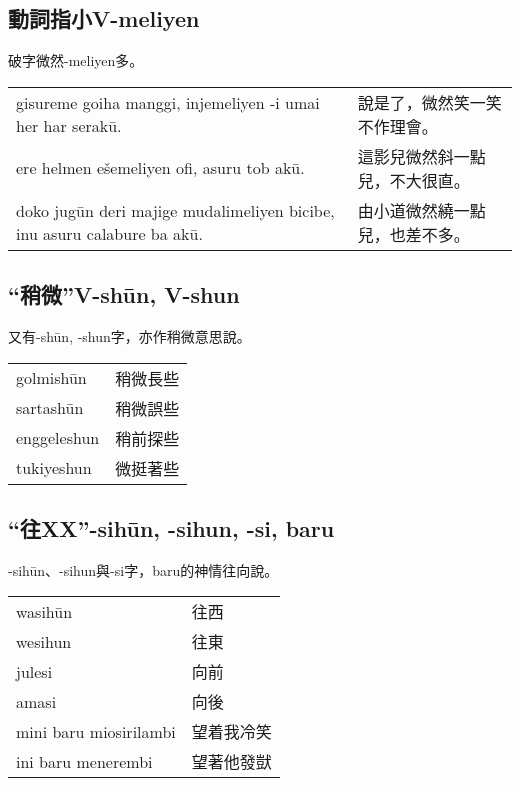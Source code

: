 \documentclass{article}
\begin{document}
\subsection{動詞指小V-meliyen}
\noindent 破字微然-meliyen多。
\begin{center}
    \begin{tabularx}{\textwidth}{XX}
        gisureme goiha manggi, injemeliyen -i umai her har serak\={u}. & 說是了，微然笑一笑不作理會。\\
        ere helmen e\v{s}emeliyen ofi, asuru tob ak\={u}. & 這影兒微然斜一點兒，不大很直。\\
        doko jug\={u}n deri majige mudalimeliyen bicibe, inu asuru calabure ba ak\={u}. & 由小道微然繞一點兒，也差不多。
    \end{tabularx}
\end{center}

\subsection{“稍微”V-sh\={u}n, V-shun}
\noindent 又有-sh\={u}n, -shun字，亦作稍微意思說。
\begin{center}
    \begin{tabularx}{\textwidth}{XX}
        golmish\={u}n & 稍微長些\\
        sartash\={u}n & 稍微誤些\\
        enggeleshun & 稍前探些\\
        tukiyeshun & 微挺著些
    \end{tabularx}
\end{center}

\subsection{“往XX”-sih\={u}n, -sihun, -si, baru}
\noindent -sih\={u}n、-sihun與-si字，baru的神情往向說。
\begin{center}
    \begin{tabularx}{\textwidth}{XX}
        wasih\={u}n & 往西\\
        wesihun & 往東\\
        julesi & 向前\\
        amasi & 向後\\
        mini baru miosirilambi & 望着我冷笑\\
        ini baru menerembi & 望著他發獃
    \end{tabularx}
\end{center}
\end{document}

